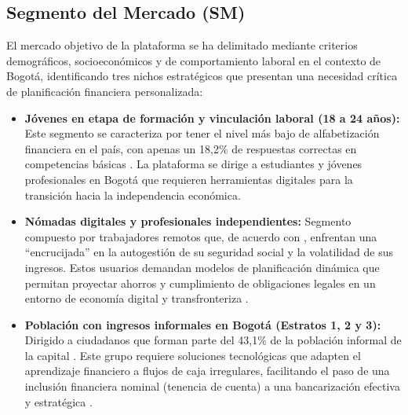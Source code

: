 \subsection*{Segmento del Mercado (SM)}

El mercado objetivo de la plataforma se ha delimitado mediante criterios demográficos, socioeconómicos y de comportamiento laboral en el contexto de Bogotá, identificando tres nichos estratégicos que presentan una necesidad crítica de planificación financiera personalizada:

\begin{itemize}
	\item \textbf{Jóvenes en etapa de formación y vinculación laboral (18 a 24 años):} Este segmento se caracteriza por tener el nivel más bajo de alfabetización financiera en el país, con apenas un 18,2\% de respuestas correctas en competencias básicas \parencite[p. 5]{Departamento01}. La plataforma se dirige a estudiantes y jóvenes profesionales en Bogotá que requieren herramientas digitales para la transición hacia la independencia económica.
	
	\item \textbf{Nómadas digitales y profesionales independientes:} Segmento compuesto por trabajadores remotos que, de acuerdo con \textcite{Rodriguez2025}, enfrentan una ``encrucijada'' en la autogestión de su seguridad social y la volatilidad de sus ingresos. Estos usuarios demandan modelos de planificación dinámica que permitan proyectar ahorros y cumplimiento de obligaciones legales en un entorno de economía digital y transfronteriza \parencite{RevistaCIES01}.
	
	\item \textbf{Población con ingresos informales en Bogotá (Estratos 1, 2 y 3):} Dirigido a ciudadanos que forman parte del 43,1\% de la población informal de la capital \parencite[p. 1]{DANE01}. Este grupo requiere soluciones tecnológicas que adapten el aprendizaje financiero a flujos de caja irregulares, facilitando el paso de una inclusión financiera nominal (tenencia de cuenta) a una bancarización efectiva y estratégica \parencite[p. 7]{Departamento01}.
\end{itemize}